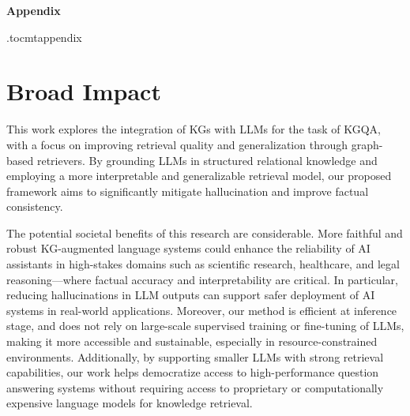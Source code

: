 \begin{center}
	\LARGE \bf {Appendix}
\end{center}

\etocdepthtag.toc{mtappendix}
\tableofcontents
\newpage

\section{Broad Impact}
This work explores the integration of KGs with LLMs for the task of KGQA, with a focus on improving retrieval quality and generalization through graph-based retrievers. By grounding LLMs in structured relational knowledge and employing a more interpretable and generalizable retrieval model, our proposed framework aims to significantly mitigate hallucination and improve factual consistency.

The potential societal benefits of this research are considerable. More faithful and robust KG-augmented language systems could enhance the reliability of AI assistants in high-stakes domains such as scientific research, healthcare, and legal reasoning—where factual accuracy and interpretability are critical. In particular, reducing hallucinations in LLM outputs can support safer deployment of AI systems in real-world applications.
Moreover, our method is efficient at inference stage, and does not rely on large-scale supervised training or fine-tuning of LLMs, making it more accessible and sustainable, especially in resource-constrained environments. Additionally, by supporting smaller LLMs with strong retrieval capabilities, our work helps democratize access to high-performance question answering systems without requiring access to proprietary or computationally expensive language models for knowledge retrieval.


